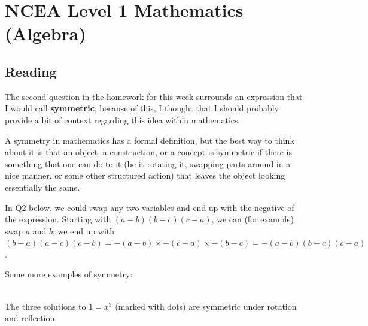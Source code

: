 \documentclass{exam}
\begin{document}
\section*{NCEA Level 1 Mathematics (Algebra)}

\subsection*{Reading}
The second question in the homework for this week surrounds an expression that I would call \textbf{symmetric}; because of this, I thought
that I should probably provide a bit of context regarding this idea within mathematics.

A symmetry in mathematics has a formal definition, but the best way to think about it is that an object, a construction, or a concept is symmetric
if there is something that one can do to it (be it rotating it, swapping parts around in a nice manner, or some other structured action) that leaves
the object looking essentially the same.

In Q2 below, we could swap any two variables and end up with the negative of the expression. Starting with $ (a - b)(b - c)(c - a) $, we can (for
example) swap $ a $ and $ b $; we end up with $ (b - a)(a - c)(c - b) = -(a - b) \times -(c - a) \times -(b - c) = -(a-b)(b-c)(c-a) $.

Some more examples of symmetry:

\begin{center}
  \\%
  \small{The three solutions to $ 1 = x^3 $ (marked with dots) are symmetric under rotation and reflection.}
\end{center}
\end{document}
